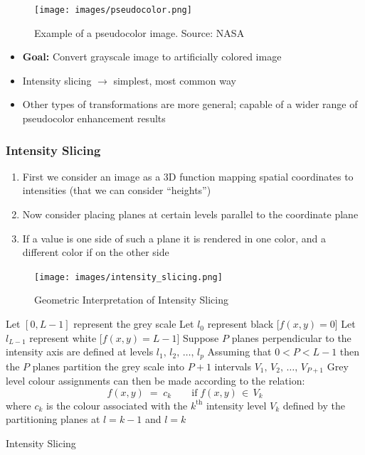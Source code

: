 \begin{figure}[H]
  \centering
  \texttt{[image: images/pseudocolor.png]}
  \caption{Example of a pseudocolor image. Source: NASA}
\end{figure}

\begin{itemize}
  \item \textbf{Goal:} Convert grayscale image to artificially colored image
  \item Intensity slicing $\rightarrow$ simplest, most common way
  \item Other types of transformations are more general; capable of a
    wider range of pseudocolor enhancement results
\end{itemize}

\subsubsection*{Intensity Slicing}

\begin{enumerate}
  \item First we consider an image as a 3D function mapping spatial
    coordinates to intensities (that we can consider \enquote{heights})
  \item Now consider placing planes at certain levels parallel to the
    coordinate plane
  \item If a value is one side of such a plane it is rendered in one
    color, and a different color if on the other side
\end{enumerate}

\begin{figure}[H]
  \centering
  \texttt{[image: images/intensity\_slicing.png]}
  \caption{Geometric Interpretation of Intensity Slicing}
\end{figure}

\begin{algorithm}[ht]
  \SetAlgoLined
  \DontPrintSemicolon
  Let $[0,L-1]$ represent the grey scale\;
  Let $l_0$ represent black [$f(x,y)=0$] \;
  Let $l_{L-1}$ represent white [$f(x,y)=L-1$]\;
  Suppose $P$ planes perpendicular to the intensity axis are defined
  at levels $l_1,\,l_2,\,\dots,\,l_p$\;
  Assuming that $0 < P < L-1$ then the $P$ planes partition the grey
  scale into $P+1$ intervals $V_1,\,V_2,\,\dots,\,V_{P+1}$\;
  Grey level colour assignments can then be made according to the relation:
  \[
    f(x,y) \;=\; c_k
    \qquad\text{if}\;
    f(x,y)\,\in\,V_k
  \]
  where $c_k$ is the colour associated with the $k^\text{th}$
  intensity level $V_k$ defined by the partitioning planes at $l=k-1$
  and $l=k$\;
  \caption{Intensity Slicing}
\end{algorithm}
